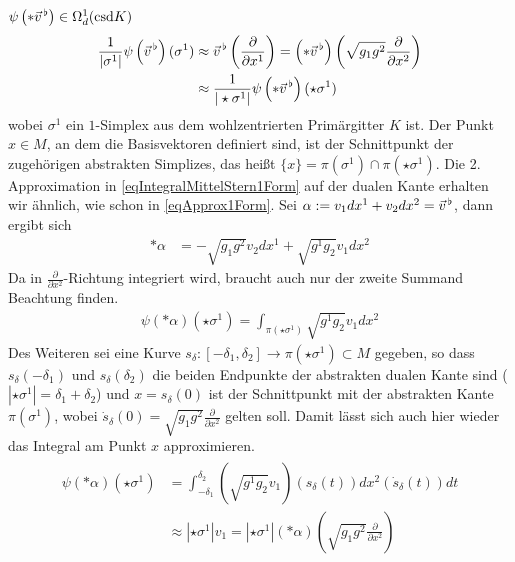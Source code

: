   \( \psi\left( *\vec{v}^{\,\flat} \right) \in \Omega^{1}_{d}(\text{csd} K)\)
  \begin{align}
  \label{eqIntegralMittelStern1Form}
  \begin{aligned}
    \frac{1}{|\sigma^{1}|} \psi\left( \vec{v}^{\,\flat} \right)(\sigma^{1}) 
                      &\approx \vec{v}^{\,\flat}\left( \frac{\partial}{\partial x^{1}} \right)
                       = \left( *\vec{v}^{\,\flat} \right)\left( \sqrt{g_{1}g^{2}} \frac{\partial}{\partial x^{2}} \right)\\
                      &\approx  \frac{1}{|\star\sigma^{1}|} \psi\left( *\vec{v}^{\,\flat} \right)(\star\sigma^{1})
  \end{aligned}
  \end{align}
  wobei \( \sigma^{1} \) ein \( 1 \)-Simplex aus dem wohlzentrierten Primärgitter \( K \) ist.
  Der Punkt \( x\in M \), an dem die Basisvektoren definiert sind, ist der Schnittpunkt der zugehörigen abstrakten Simplizes,
  das heißt \( \{x\} = \pi(\sigma^{1})\cap\pi(\star\sigma^{1}) \).
  Die 2. Approximation in \eqref{eqIntegralMittelStern1Form} auf der dualen Kante erhalten wir ähnlich, wie schon in \eqref{eqApprox1Form}.
  Sei \( \alpha:=v_{1}dx^{1} + v_{2}dx^{2} = \vec{v}^{\,\flat} \), dann ergibt sich
  \begin{align}
    *\alpha &= -\sqrt{g_{1}g^{2}}v_{2}dx^{1} + \sqrt{g^{1}g_{2}}v_{1}dx^{2}
  \end{align}
  Da in \( \frac{\partial}{\partial x^{2}} \)-Richtung integriert wird, braucht auch nur der zweite Summand Beachtung finden.
  \begin{align}
    \psi\left( *\alpha \right)(\star\sigma^{1}) = \int_{\pi(\star\sigma^{1})} \sqrt{g^{1}g_{2}} v_{1} dx^{2}
  \end{align}
  Des Weiteren sei eine Kurve \( s_{\delta}:\left[ -\delta_{1}, \delta_{2} \right] \rightarrow \pi(\star\sigma^{1}) \subset M\) gegeben, so dass
  \( s_{\delta}(-\delta_{1}) \) und \( s_{\delta}(\delta_{2}) \) die beiden Endpunkte der abstrakten dualen Kante sind (\( |\star\sigma^{1}| = \delta_{1}+\delta_{2} \))
  und \( x = s_{\delta}(0) \) ist der 
  Schnittpunkt mit der abstrakten Kante \( \pi(\sigma^{1}) \), wobei \( \dot{s}_{\delta}(0) = \sqrt{g_{1}g^{2}} \frac{\partial}{\partial x^{2}} \) gelten soll.
  Damit lässt sich auch hier wieder das Integral am Punkt \( x \) approximieren.
  \begin{align}
  \begin{aligned}
    \psi\left( *\alpha \right)(\star\sigma^{1}) 
            &= \int_{-\delta_{1}}^{\delta_{2}} \left( \sqrt{g^{1}g_{2}} v_{1} \right)(s_{\delta}(t)) dx^{2}(\dot{s}_{\delta}(t)) dt \\
            &\approx |\star\sigma^{1}|v_{1} = |\star\sigma^{1}|(*\alpha)\left( \sqrt{g_{1}g^{2}} \frac{\partial}{\partial x^{2}}\right)
  \end{aligned}
  \end{align}
  
